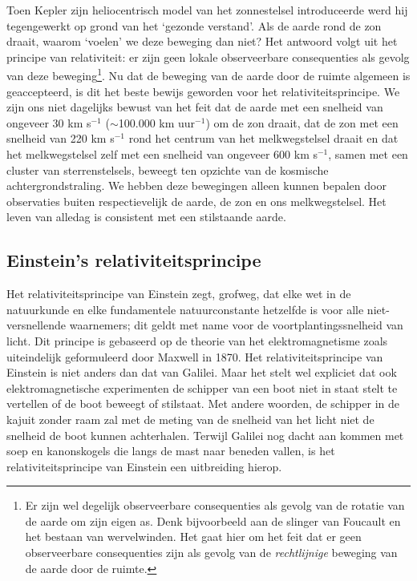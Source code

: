 Toen Kepler zijn heliocentrisch model van het zonnestelsel
introduceerde werd hij tegengewerkt op grond van het `gezonde
verstand'. Als de aarde rond de zon draait, waarom `voelen' we deze
beweging dan niet? Het antwoord volgt uit het principe van
relativiteit: er zijn geen lokale observeerbare consequenties als
gevolg van deze beweging\footnote{Er zijn wel degelijk observeerbare
consequenties als gevolg van de rotatie van de aarde om zijn eigen
as. Denk bijvoorbeeld aan de slinger van Foucault en het bestaan van
wervelwinden. Het gaat hier om het feit dat er geen observeerbare
consequenties zijn als gevolg van de {\it rechtlijnige} beweging van
de aarde door de ruimte.}. Nu dat de beweging van de aarde door de
ruimte algemeen is geaccepteerd, is dit het beste bewijs geworden voor
het relativiteitsprincipe. We zijn ons niet dagelijks bewust van het
feit dat de aarde met een snelheid van ongeveer 30 km s$^{-1}$ ($\sim$100.000
km uur$^{-1}$) om de zon draait, dat de zon met een snelheid van 220
km s$^{-1}$ rond het centrum van het melkwegstelsel draait en dat het
melkwegstelsel zelf met een snelheid van ongeveer 600 km s$^{-1}$,
samen met een cluster van sterrenstelsels, beweegt ten opzichte van de
kosmische achtergrondstraling. We hebben deze bewegingen alleen kunnen
bepalen door observaties buiten respectievelijk de aarde, de zon en
ons melkwegstelsel. Het leven van alledag is consistent met een
stilstaande aarde.

\subsection{Einstein's relativiteitsprincipe}

Het relativiteitsprincipe van Einstein zegt, grofweg, dat elke wet in
de natuurkunde en elke fundamentele natuurconstante hetzelfde is voor
alle niet-versnellende waarnemers; dit geldt met name voor de
voortplantingssnelheid van licht. Dit principe is gebaseerd op de
theorie van het elektromagnetisme zoals uiteindelijk geformuleerd door
Maxwell in 1870. Het relativiteitsprincipe van Einstein is niet anders
dan dat van Galilei. Maar het stelt wel expliciet dat ook
elektromagnetische experimenten de schipper van een boot niet in staat
stelt te vertellen of de boot beweegt of stilstaat. Met andere
woorden, de schipper in de kajuit zonder raam zal met de meting van de
snelheid van het licht niet de snelheid de boot kunnen achterhalen.
Terwijl Galilei nog dacht aan kommen met soep en kanonskogels die
langs de mast naar beneden vallen, is het relativiteitsprincipe van
Einstein een uitbreiding hierop.

